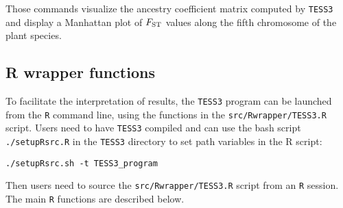 \documentclass[10pt,a4paper]{article}
\begin{document}
Those commands visualize the ancestry coefficient matrix computed by {\tt TESS3} and display a Manhattan plot of $F_{\rm ST}$ values along the fifth chromosome of the plant species.




\subsection{R wrapper functions}
To facilitate the interpretation of results, the {\tt TESS3} program can be launched from the {\tt R} command line, using the functions in the  \verb|src/Rwrapper/TESS3.R| script. Users need to have {\tt TESS3} compiled and can use the bash script \verb|./setupRsrc.R| in the {\tt TESS3} directory to set path variables in the R script:
\begin{Verbatim}[frame=single]
./setupRsrc.sh -t TESS3_program
\end{Verbatim}
Then users need to source the \verb|src/Rwrapper/TESS3.R| script from an {\tt R} session. The main {\tt R} functions are described below.
\end{document}
